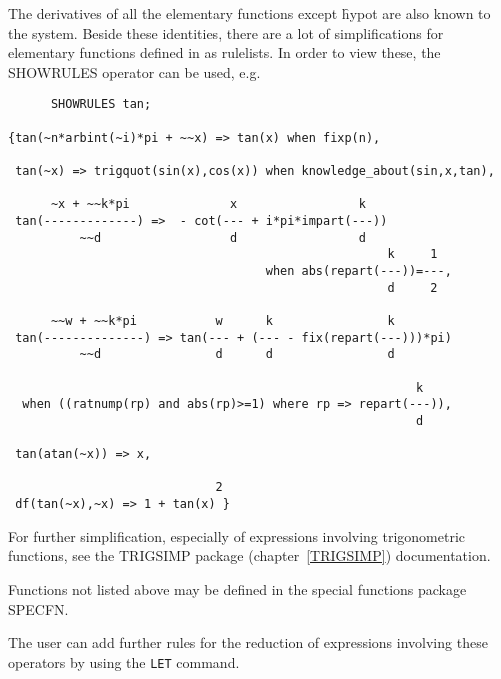 The derivatives of all the elementary functions except \f{hypot} are
also known to the system.  Beside these identities, there are a lot of
simplifications for elementary functions defined in {\REDUCE} as
rulelists.  In order to view these, the SHOWRULES operator can be
used, e.g.
\begin{verbatim}
      SHOWRULES tan;

{tan(~n*arbint(~i)*pi + ~~x) => tan(x) when fixp(n),

 tan(~x) => trigquot(sin(x),cos(x)) when knowledge_about(sin,x,tan),

      ~x + ~~k*pi              x                 k
 tan(-------------) =>  - cot(--- + i*pi*impart(---))
          ~~d                  d                 d
                                                     k     1
                                    when abs(repart(---))=---,
                                                     d     2

      ~~w + ~~k*pi           w      k                k
 tan(--------------) => tan(--- + (--- - fix(repart(---)))*pi)
          ~~d                d      d                d

                                                         k
  when ((ratnump(rp) and abs(rp)>=1) where rp => repart(---)),
                                                         d

 tan(atan(~x)) => x,

                             2
 df(tan(~x),~x) => 1 + tan(x) }
\end{verbatim}

For further simplification, especially of expressions involving
trigonometric functions, see the TRIGSIMP package
(chapter~\ref{TRIGSIMP}) documentation.

Functions not listed above may be defined in the special functions
package SPECFN.

The user can add further rules for the reduction of expressions involving
these operators by using the \texttt{LET} command.

